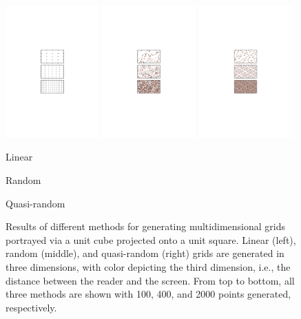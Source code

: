 \begin{figure}
    \centering
    \includegraphics[width=0.32\textwidth,keepaspectratio,natwidth=876,natheight=1605,
        trim={7.75cm 9.8cm 7.75cm 9.8cm}, clip]{linear.pdf}\hfill
    \includegraphics[width=0.32\textwidth,keepaspectratio,natwidth=876,natheight=1605,
        trim={7.75cm 9.8cm 7.75cm 9.8cm}, clip]{random.pdf}\hfill
    \includegraphics[width=0.32\textwidth,keepaspectratio,natwidth=876,natheight=1605,
        trim={7.75cm 9.8cm 7.75cm 9.8cm}, clip]{quasirandom.pdf}\\
    \parbox{0.32\textwidth}{\centering Linear}\hfill
    \parbox{0.32\textwidth}{\centering Random}\hfill
    \parbox{0.32\textwidth}{\centering Quasi-random}
    \caption[Comparison of point generation schemes (linear, random, quasi-random)]{Results of different methods for generating multidimensional grids portrayed via a unit cube projected onto a unit square. Linear (left), random (middle), and quasi-random (right) grids are generated in three dimensions, with color depicting the third dimension, i.e., the distance between the reader and the screen. From top to bottom, all three methods are shown with 100, 400, and 2000 points generated, respectively. }%
    \label{fig:grids}
\end{figure}


